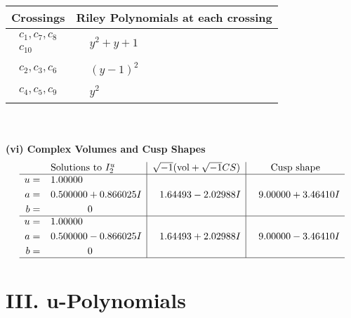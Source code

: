 \documentclass[1p]{elsarticle_modified}
\theoremstyle{definition}
\newcommand{\I}{\sqrt{-1}}
\begin{document}
\begin{tabular}{m{50pt}|m{274pt}}
Crossings & \hspace{64pt}Riley Polynomials at each crossing \\
\hline $$\begin{aligned}c_{1},c_{7},c_{8}\\c_{10}\end{aligned}$$&$\begin{aligned}
&y^2+y+1
\end{aligned}$\\
\hline $$\begin{aligned}c_{2},c_{3},c_{6}\end{aligned}$$&$\begin{aligned}
&(y-1)^2
\end{aligned}$\\
\hline $$\begin{aligned}c_{4},c_{5},c_{9}\end{aligned}$$&$\begin{aligned}
&y^2
\end{aligned}$\\
\hline
\end{tabular}\\~\\
\newpage\flushleft \textbf{(vi) Complex Volumes and Cusp Shapes}
$$\begin{array}{c|c|c}  
\text{Solutions to }I^u_{2}& \I (\text{vol} + \sqrt{-1}CS) & \text{Cusp shape}\\
 \hline 
\begin{aligned}
u &= \phantom{-}1.00000\phantom{ +0.000000I} \\
a &= \phantom{-}0.500000 + 0.866025 I \\
b &= \phantom{-0.000000 } 0\end{aligned}
 & \phantom{-}1.64493 - 2.02988 I & \phantom{-}9.00000 + 3.46410 I \\ \hline\begin{aligned}
u &= \phantom{-}1.00000\phantom{ +0.000000I} \\
a &= \phantom{-}0.500000 - 0.866025 I \\
b &= \phantom{-0.000000 } 0\end{aligned}
 & \phantom{-}1.64493 + 2.02988 I & \phantom{-}9.00000 - 3.46410 I\\
 \hline 
 \end{array}$$\newpage
\newpage\renewcommand{\arraystretch}{1}
\centering \section*{ III. u-Polynomials}
\end{document}
